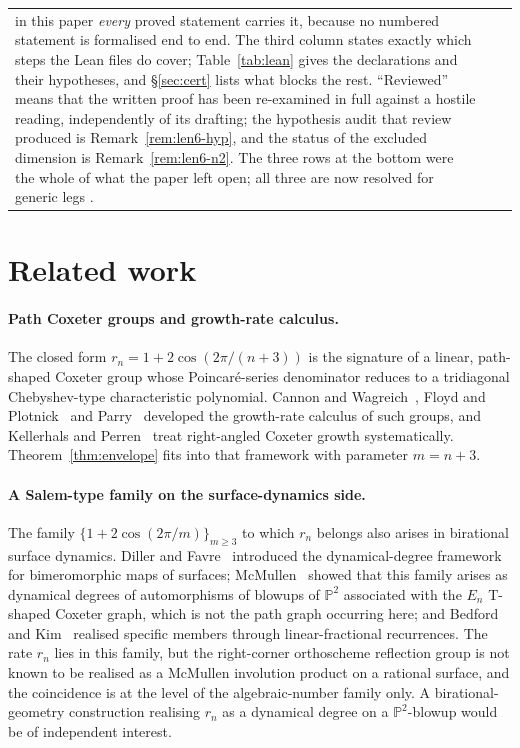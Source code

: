 \documentclass[11pt,a4paper]{article}
\theoremstyle{definition}
\theoremstyle{remark}
\theoremstyle{plain}
\begin{document}
\begin{longtable}{@{}p{} p{} p{}@{}}
{in this paper \emph{every} proved statement carries it, because no numbered statement is
formalised end to end. The third column states exactly which steps the Lean files do cover;
Table~\ref{tab:lean} gives the declarations and their hypotheses, and \S\ref{sec:cert} lists
what blocks the rest. ``Reviewed'' means that the written proof has been re-examined in full
against a hostile reading, independently of its drafting; the hypothesis audit that review
produced is Remark~\ref{rem:len6-hyp}, and the status of the excluded dimension is
Remark~\ref{rem:len6-n2}. The three rows at the bottom were the whole of what the paper left
open; all three are now resolved for generic legs \cite{Bonfioli3}.}
\label{tab:status}
\end{longtable}
\normalsize

\section{Related work}\label{sec:related}

\paragraph{Path Coxeter groups and growth-rate calculus.}
The closed form $r_n=1+2\cos(2\pi/(n+3))$ is the signature of a linear, path-shaped Coxeter
group whose Poincar\'e-series denominator reduces to a tridiagonal Chebyshev-type
characteristic polynomial. Cannon and Wagreich~\cite{cannon-wagreich}, Floyd and
Plotnick~\cite{floyd-plotnick} and Parry~\cite{parry-1989} developed the growth-rate calculus of
such groups, and Kellerhals and Perren~\cite{kellerhals-perren} treat right-angled Coxeter growth
systematically. Theorem~\ref{thm:envelope} fits into that framework with parameter $m=n+3$.

\paragraph{A Salem-type family on the surface-dynamics side.}
The family $\{1+2\cos(2\pi/m)\}_{m\ge3}$ to which $r_n$ belongs also arises in birational
surface dynamics. Diller and Favre~\cite{diller-favre} introduced the dynamical-degree framework
for bimeromorphic maps of surfaces; McMullen~\cite{mcmullen-2007} showed that this family arises
as dynamical degrees of automorphisms of blowups of $\mathbb{P}^2$ associated with the $E_n$
T-shaped Coxeter graph, which is not the path graph occurring here; and
Bedford and Kim~\cite{bedford-kim} realised specific members through linear-fractional
recurrences. The rate $r_n$ lies in this family, but the right-corner orthoscheme reflection
group is not known to be realised as a McMullen involution product on a rational surface, and
the coincidence is at the level of the algebraic-number family only. A birational-geometry
construction realising $r_n$ as a dynamical degree on a $\mathbb{P}^2$-blowup would be of
independent interest.
\end{document}
